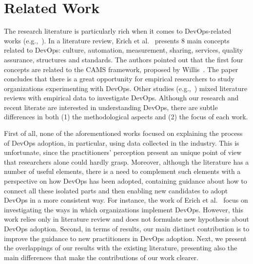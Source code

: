 \section{Related Work} \label{sec:related_work}

The research literature is particularly rich when it comes to DevOps-related
works (e.g.,~\cite{devops_a_definition_xp_15,extending_dimensions_icsea_16,qualitative_devops_journalsw_17}).
In a literature review, Erich et al.~\cite{cooperation_dev_ops_esem_2014} presents 8
main concepts related to DevOps: culture, automation, measurement, sharing,
services, quality assurance, structures and standards. The authors pointed out
that the first four concepts are
related to the CAMS framework, proposed by Willis~\cite{what_devops_means_2010}.
The paper concludes that there is a great opportunity for empirical researchers
to study organizations experimenting with DevOps.
Other studies (e.g.,~\cite{devops_a_definition_xp_15,dimensions_of_devops_xp_15,extending_dimensions_icsea_16,characterizing_devops_sbes_2016,qualitative_devops_journalsw_17})
mixed literature reviews with empirical data to investigate DevOps.
Although our research and recent literate are interested in understanding DevOps,
there are subtle differences in both (1) the methodological aspects and (2) the focus
of each work.

First of all, none of the aforementioned works focused on explaining the process of DevOps adoption,
in particular, using data collected in the industry. This is unfortunate, since the
practitioners' perception present an unique point of view that researchers
alone could hardly grasp. Moreover, although the literature has a number of
useful elements, there is a need to complement such elements with a perspective on how DevOps has
been adopted, containing guidance about how to connect all these isolated parts
and then enabling new candidates to adopt DevOps in a more consistent way.
For instance, the work of Erich et al.~\cite{qualitative_devops_journalsw_17}
focus on investigating the ways in which organizations implement DevOps.
However, this work relies only in literature review and does not formulate
new hypothesis about DevOps adoption. Second,
in terms of results, our main distinct contribution is to improve the guidance
to new practitioners in DevOps adoption.
Next, we present the overlappings of our
results with the existing literature, presenting also the main differences that
make the contributions of our work clearer.

